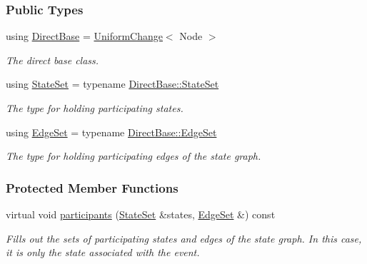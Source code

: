 \subsubsection*{Public Types}
\begin{DoxyCompactItemize}
\item 
using \hyperlink{structVertexChange_abc2e77685ed3d97f251a1d09c4daab84}{Direct\+Base} = \hyperlink{structUniformChange}{Uniform\+Change}$<$ Node $>$\hypertarget{structVertexChange_abc2e77685ed3d97f251a1d09c4daab84}{}\label{structVertexChange_abc2e77685ed3d97f251a1d09c4daab84}

\begin{DoxyCompactList}\small\item\em The direct base class. \end{DoxyCompactList}\item 
using \hyperlink{structVertexChange_afd123ce974b3d4c17a72ba3c5f41f1ee}{State\+Set} = typename \hyperlink{structUniformChange_afc89af5d5e897d7664eb9ae7770d145c}{Direct\+Base\+::\+State\+Set}\hypertarget{structVertexChange_afd123ce974b3d4c17a72ba3c5f41f1ee}{}\label{structVertexChange_afd123ce974b3d4c17a72ba3c5f41f1ee}

\begin{DoxyCompactList}\small\item\em The type for holding participating states. \end{DoxyCompactList}\item 
using \hyperlink{structVertexChange_ace150b01e4e31399074da5dcb79cf8e0}{Edge\+Set} = typename \hyperlink{structUniformChange_a2afec8b1a5887f2c6fad054d6b739fc5}{Direct\+Base\+::\+Edge\+Set}\hypertarget{structVertexChange_ace150b01e4e31399074da5dcb79cf8e0}{}\label{structVertexChange_ace150b01e4e31399074da5dcb79cf8e0}

\begin{DoxyCompactList}\small\item\em The type for holding participating edges of the state graph. \end{DoxyCompactList}\end{DoxyCompactItemize}
\subsubsection*{Protected Member Functions}
\begin{DoxyCompactItemize}
\item 
virtual void \hyperlink{structVertexChange_ac8164ae3548bd27eb48255b1242d33ed}{participants} (\hyperlink{structUniformChange_afc89af5d5e897d7664eb9ae7770d145c}{State\+Set} \&states, \hyperlink{structUniformChange_a2afec8b1a5887f2c6fad054d6b739fc5}{Edge\+Set} \&) const 
\begin{DoxyCompactList}\small\item\em Fills out the sets of participating states and edges of the state graph. In this case, it is only the state associated with the event. \end{DoxyCompactList}\end{DoxyCompactItemize}
